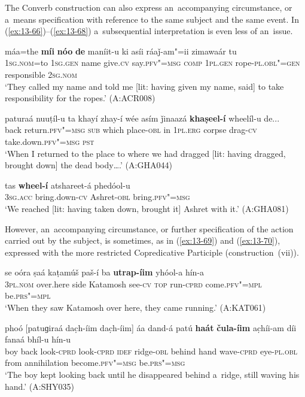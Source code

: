  The Converb construction can also express an~accompanying circumstance, or a~means specification with reference to the same subject and the same event. In (\ref{ex:13-66})--(\ref{ex:13-68}) a~subsequential interpretation is even less of an~issue.

\begin{exe}
\ex
\label{ex:13-66}
\gll máa=the \textbf{míi} \textbf{nóo} \textbf{de} maníit-u ki asíi ráaǰ-am"=ii zimawaár tu  \\
\textsc{1sg.nom}=to \textsc{1sg.gen} name give.\textsc{cv} say.\textsc{pfv"=msg} \textsc{comp}  \textsc{1pl.gen} rope-\textsc{pl.obl"=gen} responsible \textsc{2sg.nom}  \\
\glt `They called my name and told me [lit: having given my name, said] to take responsibility for the ropes.' (A:ACR008)

\ex
\label{ex:13-67}
\gll paturaá nuuṭíl-u ta khayí zhay-í wée asím ǰinaazá \textbf{khaṣeel-í} wheelíl-u de... \\
back return.\textsc{pfv"=msg} \textsc{sub} which place-\textsc{obl} in \textsc{1pl.erg}  corpse drag-\textsc{cv} take.down.\textsc{pfv"=msg} \textsc{pst} \\
\glt `When I returned to the place to where we had dragged [lit: having dragged, brought down] the dead body{\ldots}.' (A:GHA044)

\ex
\label{ex:13-68}
\gll tas \textbf{wheel-í} atshareet-á phedóol-u \\
\textsc{3sg.acc} bring.down-\textsc{cv} Ashret-\textsc{obl} bring.\textsc{pfv"=msg} \\
\glt `We reached [lit: having taken down, brought it] Ashret with it.' (A:GHA081) 
\end{exe}

However, an~accompanying circumstance, or further specification of the action carried out by the subject, is sometimes, as in (\ref{ex:13-69}) and (\ref{ex:13-70}), expressed with the more restricted Copredicative Participle (construction~(vii)).

\begin{exe}
\ex
\label{ex:13-69}
\gll se oóra ṣaá kaṭamúš paš-í ba \textbf{utrap-íim} yhóol-a hín-a \\
\textsc{3pl.nom} over.here side Katamosh see-\textsc{cv} \textsc{top} run-\textsc{cprd} come.\textsc{pfv"=mpl} be.\textsc{prs"=mpl} \\
\glt `When they saw Katamosh over here, they came running.' (A:KAT061)

\ex
\label{ex:13-70}
\gll phoó [patuɡiraá dac̣h-íim dac̣h-íim] áa dand-á patú \textbf{haát} \textbf{čula-íim} ac̣híi-am díi fanaá bhíl-u hín-u \\
boy back look-\textsc{cprd} look-\textsc{cprd} \textsc{idef}  ridge-\textsc{obl} behind hand wave-\textsc{cprd} eye-\textsc{pl.obl} from  annihilation become.\textsc{pfv"=msg} be.\textsc{prs"=msg} \\
\glt `The boy kept looking back until he disappeared behind a~ridge, still waving his hand.' (A:SHY035) 
\end{exe}

